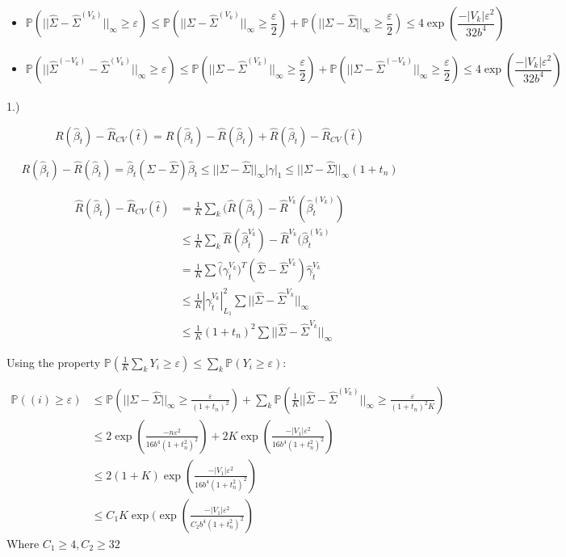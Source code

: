 \documentclass[12pt]{article}
\newcommand{\hbeta}{\hat \beta }
\newcommand{\pr}{{\mathbb P}}
\begin{document}
\begin{itemize}
\begin{itemize}
\begin{itemize}
  \item $$\pr(||\hat \Sigma - \hat \Sigma^{(V_k)}||_{\infty} \ge \varepsilon) \le \pr(||\Sigma - \hat \Sigma^{(V_k)}||_{\infty} \ge \frac{\varepsilon}2) + \pr(||\Sigma - \hat \Sigma||_{\infty} \ge \frac{\varepsilon}2) \le 4 \exp(\frac{-|V_k| \varepsilon^2}{32b^4})$$

  
  \item $$\pr(||\hat \Sigma^{(-V_k)} - \hat \Sigma^{(V_k)}||_{\infty} \ge \varepsilon) \le \pr(||\Sigma - \hat \Sigma^{(V_k)}||_{\infty} \ge \frac{\varepsilon}2) + \pr(||\Sigma - \hat \Sigma^{(-V_k)}||_{\infty} \ge \frac{\varepsilon}2) \le 4 \exp(\frac{-|V_k| \varepsilon^2}{32b^4})$$
  \end{itemize}
  \end{itemize}
  1.)

    $$R(\hbeta_{\hat t}) - \hat R_{CV}(\hat t)
    =  R(\hbeta_{\hat t}) - \hat R(\hbeta_{\hat t}) + \hat R(\hbeta_{\hat t}) - \hat R_{CV}(\hat t)$$


  $$R(\hbeta_{\hat t}) - \hat R(\hbeta_{\hat t}) = \hbeta_{\hat t} (\Sigma - \hat \Sigma) \hbeta_{\hat t} \le ||\Sigma - \hat \Sigma||_{\infty} |\gamma|_1 \le ||\Sigma - \hat \Sigma||_{\infty} (1+t_n)$$

  \begin{align*}
    \hat R(\hbeta_{\hat t}) - \hat R_{CV}(\hat t)
    &= \frac 1K \sum_k (\hat R(\hbeta_{\hat t}) - \hat R^{V_k}(\hbeta_{\hat t}^{(V_k)})
    \\&\le \frac 1K \sum_k \hat R(\hbeta^{V_k}_{\hat t}) - \hat R^{V_k}(\hbeta_{\hat t}^{(V_k)}
    \\&= \frac 1K \sum \hat (\gamma^{V_k}_{\hat t})^T (\hat \Sigma - \hat \Sigma^{V_k})\hat \gamma^{V_k}_{\hat t}
    \\&\le \frac1K |\gamma^{V_k}_{\hat t}|_{L_1}^2 \sum ||\hat \Sigma - \hat \Sigma^{V_k}||_{\infty}
    \\&\le \frac1K (1+t_n)^2 \sum ||\hat \Sigma - \hat \Sigma^{V_k}||_{\infty}
  \end{align*}

  Using the property $\pr(\frac1K \sum_k Y_i \ge \varepsilon) \le \sum_k \pr(Y_i \ge \varepsilon)$:
  
  \begin{align*}
    \mathbb P ( (i) \ge \varepsilon)
    &\le \mathbb P( ||\Sigma - \hat \Sigma||_{\infty} \ge \frac{\varepsilon}{(1+t_n)^2}) + \sum_{k} \pr( \frac1K ||\hat \Sigma - \hat \Sigma^{(V_k)}||_{\infty} \ge \frac{\varepsilon}{(1+t_n)^2K})
    \\& \le 2 \exp(\frac{-n \varepsilon^2}{16 b^4 (1+t_n^2)^2}) + 2K \exp(\frac{-|V_1| \varepsilon^2}{16 b^4 (1+t_n^2)^2})
    \\&\le 2(1+K) \exp(\frac{-|V_1| \varepsilon^2}{16 b^4 (1+t_n^2)^2})
    \\&\le C_1 K \exp(\exp(\frac{-|V_1| \varepsilon^2}{C_2 b^4 (1+t_n^2)^2})
  \end{align*}
  Where $C_1 \ge 4, C_2 \ge 32$
  

\end{itemize}
\end{document}
